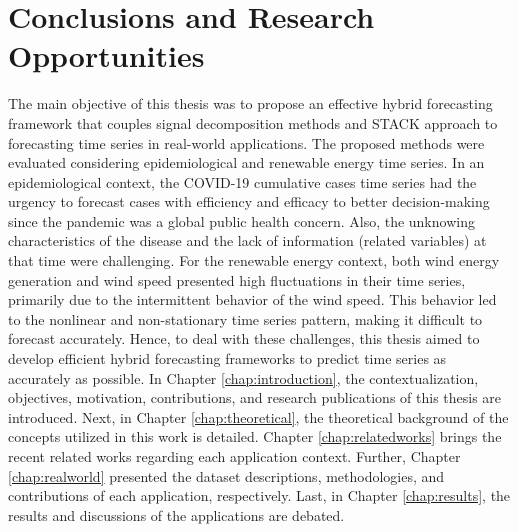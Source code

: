 \chapter{Conclusions and Research Opportunities} \label{chap:conclusion}

The main objective of this thesis was to propose an effective hybrid forecasting framework that couples signal decomposition methods and \ac{STACK} approach to forecasting time series in real-world applications. The proposed methods were evaluated considering epidemiological and renewable energy time series. 
In an epidemiological context, the \ac{COVID-19} cumulative cases time series had the urgency to forecast cases with efficiency and efficacy to better decision-making since the pandemic was a global public health concern. Also, the unknowing characteristics of the disease and the lack of information (related variables) at that time were challenging. For the renewable energy context, both wind energy generation and wind speed presented high fluctuations in their time series, primarily due to the intermittent behavior of the wind speed. This behavior led to the nonlinear and non-stationary time series pattern, making it difficult to forecast accurately. Hence, to deal with these challenges, this thesis aimed to develop efficient hybrid forecasting frameworks to predict time series as accurately as possible.
In Chapter \ref{chap:introduction}, the contextualization, objectives, motivation, contributions, and research publications of this thesis are introduced. Next, in Chapter \ref{chap:theoretical}, the theoretical background of the concepts utilized in this work is detailed. Chapter \ref{chap:relatedworks} brings the recent related works regarding each application context. Further, Chapter \ref{chap:realworld} presented the dataset descriptions, methodologies, and contributions of each application, respectively. Last, in Chapter \ref{chap:results}, the results and discussions of the applications are debated.

